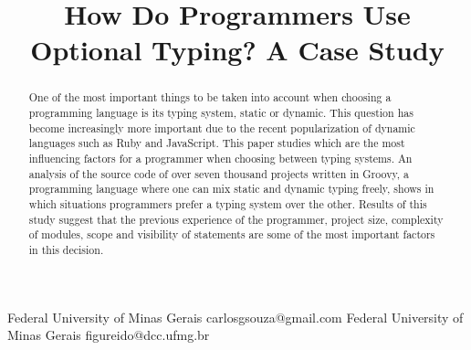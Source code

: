 \documentclass[preprint]{sigplanconf}
\begin{document}
\setlength{\pdfpageheight}{\paperheight}
\setlength{\pdfpagewidth}{\paperwidth}






\title{How Do Programmers Use Optional Typing? A Case Study}

           {Federal University of Minas Gerais}
           {carlosgsouza@gmail.com}
           {Federal University of Minas Gerais}
           {figureido@dcc.ufmg.br}

\maketitle

\begin{abstract}
One of the most important things to be taken into account when choosing a programming language is its typing system, static or dynamic. 
This question has become increasingly more important due to the recent popularization of dynamic languages such as Ruby and JavaScript. 
This paper studies which are the most influencing factors for a programmer when choosing between typing systems. 
An analysis of the source code of over seven thousand projects written in Groovy, a programming language where one can mix static and dynamic typing freely, shows in which situations programmers prefer a typing system over the other. 
Results of this study suggest that the previous experience of the programmer, project size, complexity of modules, scope and visibility of statements are some of the most important factors in this decision.
\end{abstract}
\end{document}
